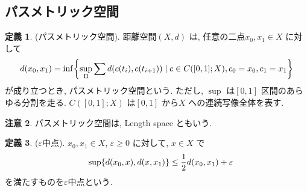 \documentclass[10pt, fleqn, label-section=none]{bxjsarticle}
\theoremstyle{definition}
\newtheorem{dfn}{定義}[section]
\newtheorem{remark}[dfn]{注意}
\newcommand{\veps}{\varepsilon}
\newcommand{\cbra}[1]{\mleft\{#1\mright\}}
\renewcommand{\;}{\, ; \,}
\begin{document}
\subsection{パスメトリック空間} 

\begin{dfn}(パスメトリック空間). 距離空間$(X, d)$ は, 任意の二点$x_0, x_1 \in X$ に対して
\begin{align*} d(x_0, x_1) = \inf \cbra{ \sup_{\Pi} \sum d(c(t_i), c(t_{i+1} )  ) \mid c \in C([0,1]; X), c_0 = x_0, c_1 = x_1 }   \end{align*}
が成り立つとき, パスメトリック空間という. ただし, $\sup$ は$[0, 1]$ 区間のあらゆる分割を走る. $C([0,1]; X)$ は$[0,1]$ から$X$ への連続写像全体を表す. 
\end{dfn}

\begin{remark}
パスメトリック空間は, Length space ともいう. 
\end{remark}

\begin{dfn}($\veps$中点). $x_0, x_1 \in X$, $\veps \geq 0 $ に対して, $x \in X$ で 
\begin{align*} \quad  \sup \cbra{ d(x_0 ,  x) , d(x , x_1)} \leq \frac{1}{2} d(x_0, x_1) + \veps \end{align*}
 を満たすものを$\veps$中点という. 
\end{dfn}
\end{document}
